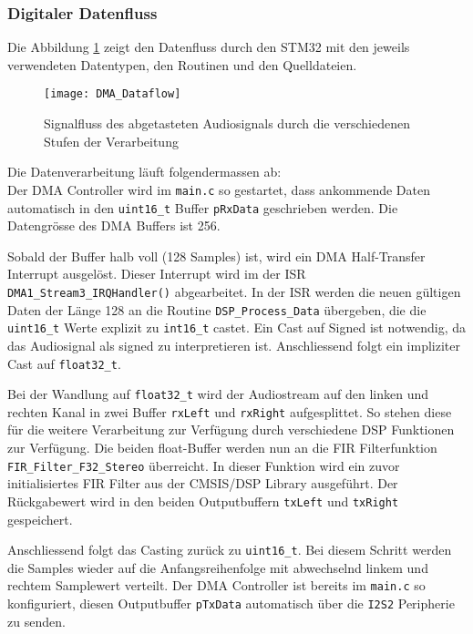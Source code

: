 \subsubsection{Digitaler Datenfluss}
\label{sec:Dataflow}

Die Abbildung \ref{pic:DMA_Dataflow} zeigt den Datenfluss durch den STM32 mit den jeweils verwendeten Datentypen, den Routinen und den Quelldateien.

\begin{figure}[H]
	\centering
	\texttt{[image: DMA\_Dataflow]}
	\caption{Signalfluss des abgetasteten Audiosignals durch die verschiedenen Stufen der Verarbeitung}
	\label{pic:DMA_Dataflow}
\end{figure}

 Die Datenverarbeitung läuft folgendermassen ab:\\

Der DMA Controller wird im \texttt{main.c} so gestartet, dass ankommende Daten automatisch in den \texttt{uint16\_t} Buffer \texttt{pRxData} geschrieben werden. Die Datengrösse des DMA Buffers ist 256. 

Sobald der Buffer halb voll (128 Samples) ist, wird ein DMA Half-Transfer Interrupt ausgelöst.
Dieser Interrupt wird im der ISR \texttt{DMA1\_Stream3\_IRQHandler()} abgearbeitet. 
In der ISR werden die neuen gültigen Daten der Länge 128 an die Routine \texttt{DSP\_Process\_Data} übergeben, die die \texttt{uint16\_t} Werte explizit zu \texttt{int16\_t} castet. Ein Cast auf Signed ist notwendig, da das Audiosignal als signed zu interpretieren ist. Anschliessend folgt ein impliziter Cast auf \texttt{float32\_t}.

Bei der Wandlung auf \texttt{float32\_t} wird der Audiostream auf den linken und rechten Kanal in zwei Buffer \texttt{rxLeft} und \texttt{rxRight} aufgesplittet.
So stehen diese für die weitere Verarbeitung zur Verfügung durch verschiedene DSP Funktionen zur Verfügung.
Die beiden float-Buffer werden nun an die FIR Filterfunktion \texttt{FIR\_Filter\_F32\_Stereo} überreicht. In dieser Funktion wird ein zuvor initialisiertes FIR Filter aus der CMSIS/DSP Library ausgeführt.
Der Rückgabewert wird in den beiden Outputbuffern \texttt{txLeft} und \texttt{txRight} gespeichert.

Anschliessend folgt das Casting zurück zu \texttt{uint16\_t}. Bei diesem Schritt werden die Samples wieder auf die Anfangsreihenfolge mit abwechselnd linkem und rechtem Samplewert verteilt.
Der DMA Controller ist bereits im \texttt{main.c} so konfiguriert, diesen Outputbuffer \texttt{pTxData} automatisch über die \texttt{I2S2} Peripherie zu senden.

